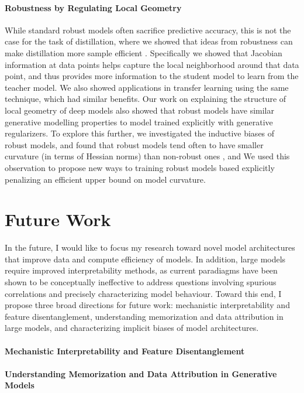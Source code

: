 \documentclass{article}
\renewcommand{\cite}{\citep}
\begin{document}
\paragraph*{Robustness by Regulating Local Geometry} While standard robust models often sacrifice predictive accuracy, this is not the case for the task of distillation, where we showed that ideas from robustness can make distillation more sample efficient \cite{srinivas2018knowledge}. Specifically we showed that Jacobian information at data points helps capture the local neighborhood around that data point, and thus provides more information to the student model to learn from the teacher model. 
We also showed applications in transfer learning using the same technique, which had similar benefits. Our work on explaining the structure of local geometry of deep models \cite{srinivas2021rethinking} also showed that robust models have similar generative modelling properties to model trained explicitly with generative regularizers. To explore this further, we investigated the inductive biases of robust models, and found that robust models tend often to have smaller curvature (in terms of Hessian norms) than non-robust ones \cite{srinivas2022efficient}, and We used this observation to propose new ways to training robust models based explicitly penalizing an efficient upper bound on model curvature.

\section*{Future Work}\label{sec2}
In the future, I would like to focus my research toward novel model architectures that improve data and compute efficiency of models. In addition, large models require improved interpretability methods, as current paradiagms have been shown to be conceptually ineffective \cite{lipton2018mythos} to address questions involving spurious correlations and precisely characterizing model behaviour. Toward this end, I propose three broad directions for future work: mechanistic interpretability and feature disentanglement, understanding memorization and data attribution in large models, and characterizing implicit biases of model architectures.    

\paragraph{Mechanistic Interpretability and Feature Disentanglement}

\paragraph{Understanding Memorization and Data Attribution in Generative Models}
\end{document}
